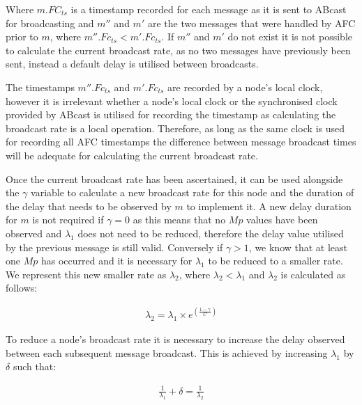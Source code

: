     Where $m.FC_{ts}$ is a timestamp recorded for each message as it is sent to \textsf{ABcast} for broadcasting and $m''$ and $m'$ are the two messages that were handled by AFC prior to $m$, where $m''.Fc_{ts} < m'.Fc_{ts}$.  If $m''$ and $m'$ do not exist it is not possible to calculate the current broadcast rate, as no two messages have previously been sent, instead a default delay is utilised between broadcasts.  
    
    The timestamps $m''.Fc_{ts}$ and $m'.Fc_{ts}$ are recorded by a node's local clock, however it is irrelevant whether a node's local clock or the  synchronised clock provided by \textsf{ABcast} is utilised for recording the timestamp as calculating the broadcast rate is a local operation.  Therefore, as long as the same clock is used for recording all AFC timestamps the difference between message broadcast times will be adequate for calculating the current broadcast rate.   
    
    Once the current broadcast rate has been ascertained, it can be used alongside the $\gamma$ variable to calculate a new broadcast rate for this node and the duration of the delay that needs to be observed by $m$ to implement it.  A new delay duration for $m$ is not required if $\gamma = 0$ as this means that no $Mp$ values have been observed and $\lambda_1$ does not need to be reduced, therefore the delay value utilised by the previous message is still valid.  Conversely if $\gamma > 1$, we know that at least one $Mp$ has occurred and it is necessary for $\lambda_1$ to be reduced to a smaller rate.  We represent this new smaller rate as $\lambda_2$, where $\lambda_2 < \lambda_1$ and $\lambda_2$ is calculated as follows:
    
      \begin{equation*}
		     \begin{aligned}
		         \lambda_2 = \lambda_1 \times e ^{ ({\frac{1-\gamma}{C}})}
		     \end{aligned}
    \end{equation*} 
    
    To reduce a node's broadcast rate it is necessary to increase the delay observed between each subsequent message broadcast.  This is achieved by increasing $\lambda_1$ by $\delta$ such that:
    
    \begin{equation} \label{eq:rate_plus_delta}
		     \begin{aligned}
		         \frac{1}{\lambda_1} + \delta = \frac{1}{\lambda_2}
		     \end{aligned}
    \end{equation} 
    
